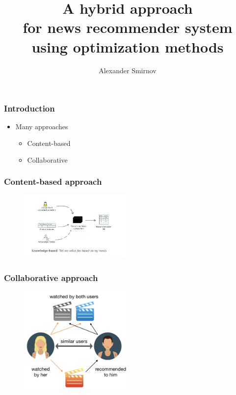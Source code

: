 \documentclass[xetex,mathserif,serif]{beamer}
\title[Recommender system]{A hybrid approach \\ for news recommender system \\ using optimization methods}
\author[Alexander Smirnov]{Alexander Smirnov}
\begin{document}
\frame{\titlepage}



\begin{frame}
	\frametitle{Introduction}

	\begin{itemize}
		\item Many approaches
		      \begin{itemize}
			      \item Content-based
			      \item Collaborative
		      \end{itemize}
	\end{itemize}

\end{frame}


\begin{frame}
	\frametitle{Content-based approach}

	\begin{figure}[h]
		\includegraphics[width=0.5\textwidth]{./images/content_based.jpeg}
		\centering
	\end{figure}
\end{frame}


\begin{frame}
	\frametitle{Collaborative approach}

	\begin{figure}[h]
		\includegraphics[width=0.5\textwidth]{./images/collaborative.png}
		\centering
	\end{figure}
\end{frame}
\end{document}
